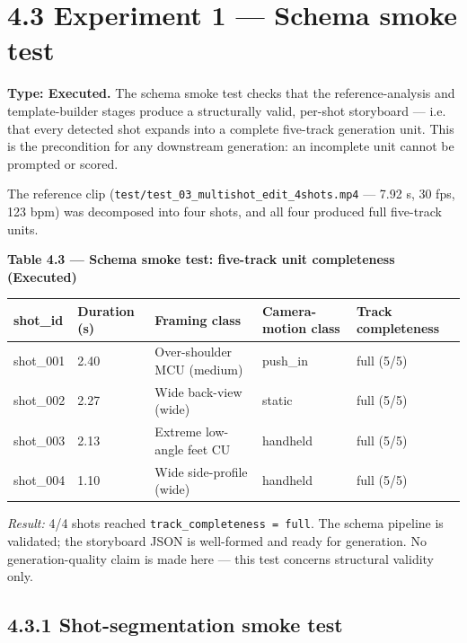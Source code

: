 \documentclass[10pt,twocolumn,letterpaper]{article}
\begin{document}
\section*{4.3 Experiment 1 --- Schema smoke test}

\textbf{Type: Executed.} The schema smoke test checks that the reference-analysis and template-builder stages produce a structurally valid, per-shot storyboard --- i.e. that every detected shot expands into a complete five-track generation unit. This is the precondition for any downstream generation: an incomplete unit cannot be prompted or scored.

The reference clip (\texttt{test/test\_03\_multishot\_edit\_4shots.mp4} --- 7.92 s, 30 fps, 123 bpm) was decomposed into four shots, and all four produced full five-track units.

\begin{table}[t]
\centering
{\footnotesize\textbf{\textbf{Table 4.3 --- Schema smoke test: five-track unit completeness (Executed)}}}\par\vspace{3pt}
\footnotesize
\begin{tabularx}{\textwidth}{ll>{\RaggedRight\arraybackslash}X>{\RaggedRight\arraybackslash}X>{\RaggedRight\arraybackslash}X}
\toprule
shot\_id & Duration (s) & Framing class & Camera-motion class & Track completeness \\
\midrule
shot\_001 & 2.40 & Over-shoulder MCU (medium) & push\_in & full (5/5) \\
shot\_002 & 2.27 & Wide back-view (wide) & static & full (5/5) \\
shot\_003 & 2.13 & Extreme low-angle feet CU & handheld & full (5/5) \\
shot\_004 & 1.10 & Wide side-profile (wide) & handheld & full (5/5) \\
\bottomrule
\end{tabularx}
\end{table}

\emph{Result:} 4/4 shots reached \texttt{track\_completeness = full}. The schema pipeline is validated; the storyboard JSON is well-formed and ready for generation. No generation-quality claim is made here --- this test concerns structural validity only.


\subsection*{4.3.1 Shot-segmentation smoke test}
\end{document}
